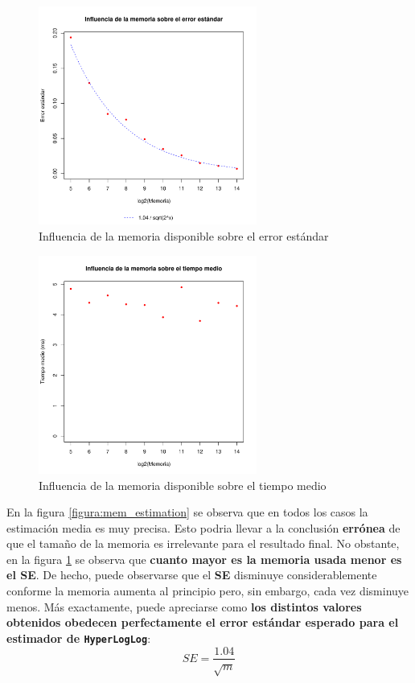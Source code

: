 \begin{figure}[h!]
    \centering
        \includegraphics[width=0.64\textwidth]{../figs/D1/mem_errors_rel.pdf}
        \caption{Influencia de la memoria disponible sobre el error estándar}
    \label{figura:mem_errors}
\end{figure}

\begin{figure}[h!]
    \centering
        \includegraphics[width=0.64\textwidth]{../figs/D1/mem_time_rel.pdf}
        \caption{Influencia de la memoria disponible sobre el tiempo medio}
    \label{figura:mem_time}
\end{figure}

\clearpage

En la figura \ref{figura:mem_estimation} se observa que en todos los casos la estimación media es muy precisa. Esto podria llevar a
la conclusión \textbf{errónea} de que el tamaño de la memoria es irrelevante para el resultado final. No obstante, en la figura
\ref{figura:mem_errors} se observa que \textbf{cuanto mayor es la memoria usada menor es el \textbf{SE}}.
De hecho, puede observarse
que el \textbf{SE} disminuye considerablemente conforme la memoria aumenta al principio pero, sin embargo, cada vez disminuye
menos. Más exactamente, puede apreciarse como \textbf{los distintos valores obtenidos obedecen perfectamente el error estándar
esperado para el estimador de \texttt{HyperLogLog}}:
$$SE = \frac{1.04}{\sqrt{m}}$$


